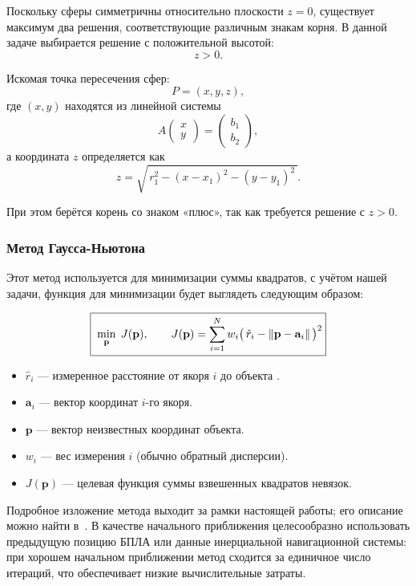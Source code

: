 \documentclass[a4paper,11pt]{article} %
\newcounter{subsubsubsection}[subsubsection]
\begin{document}
Поскольку сферы симметричны относительно плоскости \(z=0\), существует максимум два решения, соответствующие различным знакам корня.  
В данной задаче выбирается решение с положительной высотой:
\[
z > 0.
\]


Искомая точка пересечения сфер:
\[
P = (x, y, z),
\]
где \((x,y)\) находятся из линейной системы
\[
A\begin{pmatrix}x\\y\end{pmatrix} = \begin{pmatrix}b_1\\b_2\end{pmatrix},
\]
а координата \(z\) определяется как
\[
z = \sqrt{\,r_1^2 - (x - x_1)^2 - (y - y_1)^2\,}.
\]

При этом берётся корень со знаком «плюс», так как требуется решение с \(z>0\).

\subsubsection{Метод Гаусса-Ньютона}

Этот метод используется для минимизации суммы квадратов, с учётом нашей задачи,
функция для минимизации будет выглядеть следующим образом:

\[
\boxed{%
\; \min_{\mathbf{p}}\; J(\mathbf{p}), \qquad
J(\mathbf{p}) = \sum_{i=1}^{N} w_i\bigl(\,\hat r_i - \|\mathbf{p}-\mathbf{a}_i\|\,\bigr)^2
}
\]

\begin{itemize}
  \item $\hat r_i$ \;— измеренное расстояние от якоря $i$ до объекта .
  \item $\mathbf{a}_i$ \;— вектор координат $i$-го якоря.
  \item $\mathbf{p}$ \;— вектор неизвестных координат объекта.
  \item $w_i$ \;— вес измерения $i$ (обычно обратный дисперсии).
  \item $J(\mathbf{p})$ \;— целевая функция суммы взвешенных квадратов невязок.
\end{itemize}

Подробное изложение метода выходит за рамки настоящей работы; его описание можно найти в~\cite{hayes1996}.
В качестве начального приближения целесообразно использовать предыдущую позицию БПЛА
или данные инерциальной навигационной системы: при хорошем начальном приближении метод
сходится за единичное число итераций, что обеспечивает низкие вычислительные затраты.
\end{document}
